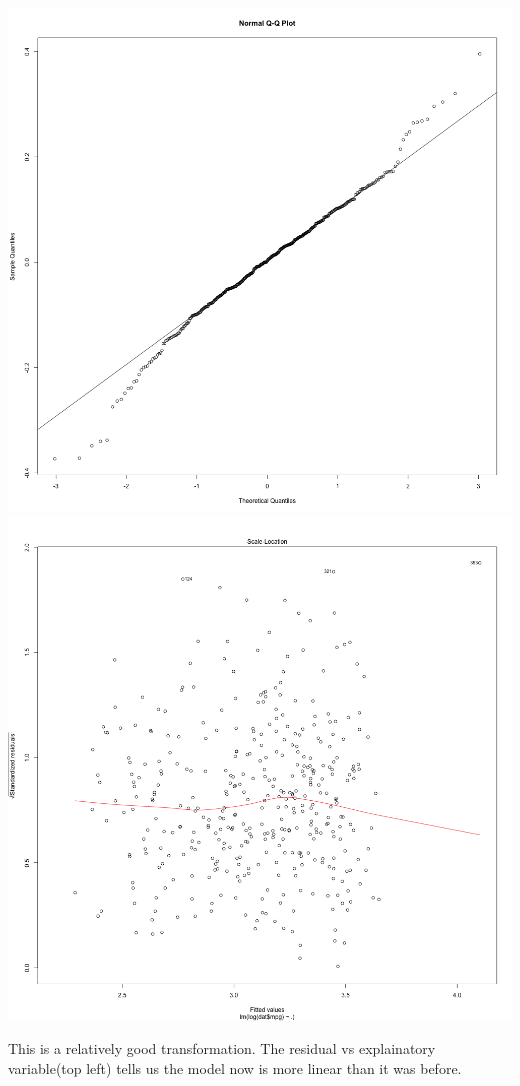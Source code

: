 \documentclass[11pt]{article} %
\begin{document}
\begin{center}
\includegraphics[scale=0.13]{3_QQplot}
\includegraphics[scale=0.13]{3_Variance}
\end{center}
This is a relatively good transformation. The residual vs explainatory variable(top left) tells us the model now is more linear than it was before.
\end{document}
